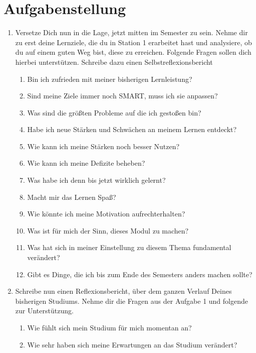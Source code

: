 \documentclass[a4paper,oneside]{scrarticle}
\begin{document}
	\section*{Aufgabenstellung}

	\begin{enumerate}
		\item Versetze Dich nun in die Lage, jetzt mitten im Semester zu sein. Nehme dir zu erst deine Lernziele, die du in Station 1 erarbeitet hast und analysiere, ob du auf einem guten Weg bist, diese zu erreichen. Folgende Fragen sollen dich hierbei unterstützen. Schreibe dazu einen Selbstreflexionsbericht 
		\begin{enumerate}
			\item Bin ich zufrieden mit meiner bisherigen Lernleistung?
			\item Sind meine Ziele immer noch SMART, muss ich sie anpassen?
			\item Was sind die größten Probleme auf die ich gestoßen bin?
			\item Habe ich neue Stärken und Schwächen an meinem Lernen entdeckt?
			\item Wie kann ich meine Stärken noch besser Nutzen?
			\item Wie kann ich meine Defizite beheben?
			\item Was habe ich denn bis jetzt wirklich gelernt?
			\item Macht mir das Lernen Spaß?
			\item Wie könnte ich meine Motivation aufrechterhalten?
			\item Was ist für mich der Sinn, dieses Modul zu machen?
			\item Was hat sich in meiner Einstellung zu diesem Thema fundamental verändert?
			\item Gibt es Dinge, die ich bis zum Ende des Semesters anders machen sollte?
		\end{enumerate}
		\item Schreibe nun einen Reflexionsbericht, über dem ganzen Verlauf Deines bisherigen Studiums. Nehme dir die Fragen aus der Aufgabe 1 und folgende zur Unterstützung.
		\begin{enumerate}
			\item Wie fühlt sich mein Studium für mich momentan an?
			\item Wie sehr haben sich meine Erwartungen an das Studium verändert?
		\end{enumerate}

	\end{enumerate}
\end{document}
